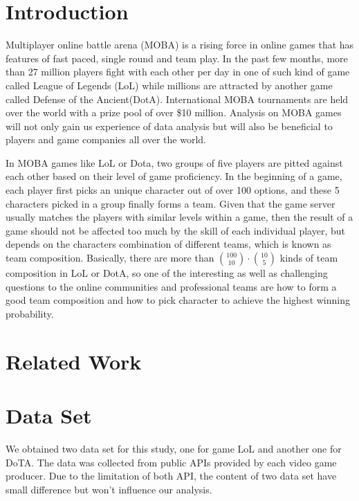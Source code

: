 \documentclass[conference]{IEEEtran}
\begin{document}
\section{Introduction}

Multiplayer online battle arena (MOBA) is a rising force in online games that has features of fast paced, single round and team play. In the past few months, more than 27 million players fight with each other per day in one of such kind of game called League of Legends (LoL)\cite{Ian} while millions are attracted by another game called Defense of the Ancient(DotA). International MOBA tournaments are held over the world with a prize pool of over \$10 million\cite{Valve}.  Analysis on MOBA games will not only gain us experience of data analysis but will also be beneficial to players and game companies all over the world.

In MOBA games like LoL or Dota, two groups of five players are pitted against each other based on their level of game proficiency. In the beginning of a game, each player first picks an unique character out of over 100 options, and these 5 characters picked in a group finally forms a team. Given that the game server usually matches the players with similar levels within a game, then the result of a game should not be affected too much by the skill of each individual player, but depends on the characters combination of different teams, which is known as team composition. Basically, there are more than $\binom{100}{10}\cdot\binom{10}{5}$ kinds of team composition in LoL or DotA, so one of the interesting as well as challenging questions to the online communities and professional teams are how to form a good team composition and how to pick character to achieve the highest winning probability.

\section{Related Work}




\section{Data Set}
We obtained two data set for this study, one for game LoL and another one for DoTA. The data was collected from public APIs provided by each video game producer. Due to the limitation of both API, the content of two data set have small difference but won't influence our analysis.
\end{document}
